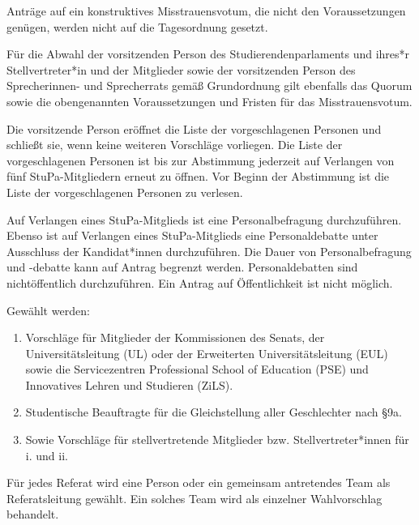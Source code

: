 \documentclass[10pt,a4paper]{scrartcl}
\begin{document}
\begin{contract}
  Anträge auf ein konstruktives Misstrauensvotum, die nicht den
  Voraussetzungen genügen, werden nicht auf die Tagesordnung gesetzt.
     
  Für die Abwahl der vorsitzenden Person des Studierendenparlaments und
  ihres*r Stellvertreter*in und der Mitglieder sowie der vorsitzenden
  Person des Sprecherinnen- und Sprecherrats gemäß Grundordnung gilt
  ebenfalls das Quorum sowie die obengenannten Voraussetzungen und
  Fristen für das Misstrauensvotum.


\label{vorschlagsliste}

Die vorsitzende Person eröffnet die Liste der vorgeschlagenen Personen
und schließt sie, wenn keine weiteren Vorschläge vorliegen. Die Liste
der vorgeschlagenen Personen ist bis zur Abstimmung jederzeit auf
Verlangen von fünf StuPa-Mitgliedern erneut zu öffnen. Vor Beginn der
Abstimmung ist die Liste der vorgeschlagenen Personen zu verlesen.


\label{personalbefragung-und-personaldebatte}

Auf Verlangen eines StuPa-Mitglieds ist eine Personalbefragung
durchzuführen. Ebenso ist auf Verlangen eines StuPa-Mitglieds eine
Personaldebatte unter Ausschluss der Kandidat*innen durchzuführen. Die
Dauer von Personalbefragung und -debatte kann auf Antrag begrenzt
werden. Personaldebatten sind nichtöffentlich durchzuführen. Ein Antrag
auf Öffentlichkeit ist nicht möglich.


\label{wahl-von-referaten-und-kommissionsmitgliedern}

Gewählt werden: 
\begin{enumerate}
\item 
	Vorschläge für Mitglieder der
Kommissionen des Senats, der Universitätsleitung (UL) oder der
Erweiterten Universitätsleitung (EUL) sowie die Servicezentren
Professional School of Education (PSE) und Innovatives Lehren und
Studieren (ZiLS).
\item 
	Studentische Beauftragte für die Gleichstellung aller Geschlechter nach §9a.
\item 
	Sowie Vorschläge für stellvertretende
Mitglieder bzw. Stellvertreter*innen für i. und ii.
\end{enumerate}

Für
jedes Referat wird eine Person oder ein gemeinsam antretendes Team als
Referatsleitung gewählt. Ein solches Team wird als einzelner
Wahlvorschlag behandelt.


\end{contract}
\end{document}
